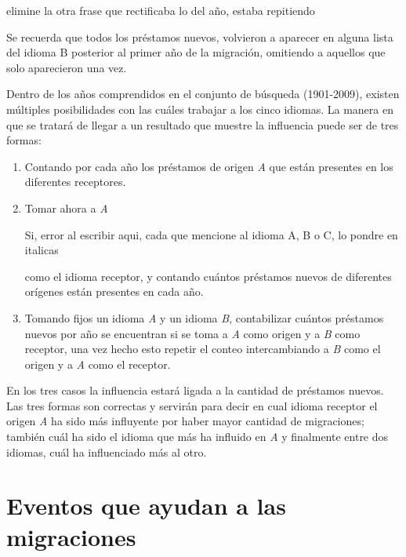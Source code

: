 \begin{tcolorbox}
	[colback=red!5!white,colframe=red!75!black]
	elimine la otra frase que rectificaba lo del año, estaba repitiendo
\end{tcolorbox}


Se recuerda que todos los préstamos nuevos, volvieron a aparecer en alguna
lista del idioma B posterior al primer año de la migración, omitiendo a
aquellos que solo aparecieron una vez. 

Dentro de los años comprendidos en el conjunto de búsqueda
(1901-2009), existen múltiples posibilidades con las cuáles trabajar a los
cinco idiomas. La manera en que se tratará de llegar a un resultado que muestre
la influencia puede ser de tres formas:
\begin{enumerate}
\item Contando por cada año los préstamos de origen \textit{A} que están presentes en los diferentes receptores.
\item Tomar ahora a \textit{A}  

\begin{tcolorbox}
	[colback=red!5!white,colframe=red!75!black]
	Si, error al escribir aqui, cada que mencione al idioma A, B o C, lo pondre en italicas
\end{tcolorbox}


como el idioma receptor, y contando cuántos préstamos nuevos de diferentes orígenes están presentes en cada año. 
\item Tomando fijos un idioma \textit{A} y un idioma \textit{B},  contabilizar
cuántos préstamos nuevos por año se encuentran si se toma a \textit{A} como
origen y a \textit{B} como receptor,  una vez hecho esto  repetir el conteo
intercambiando a \textit{B} como el origen y a \textit{A} como el receptor. 
\end{enumerate}


En los tres casos la influencia estará ligada a la cantidad de préstamos
nuevos.  Las tres formas son correctas y servirán para decir en cual idioma
receptor  el origen \textit{A} ha sido más influyente por haber mayor cantidad
de migraciones; también cuál ha sido el idioma  que más ha influido en
\textit{A} y finalmente entre dos idiomas,  cuál ha influenciado más al otro. 
\section{Eventos que ayudan a las migraciones} %

